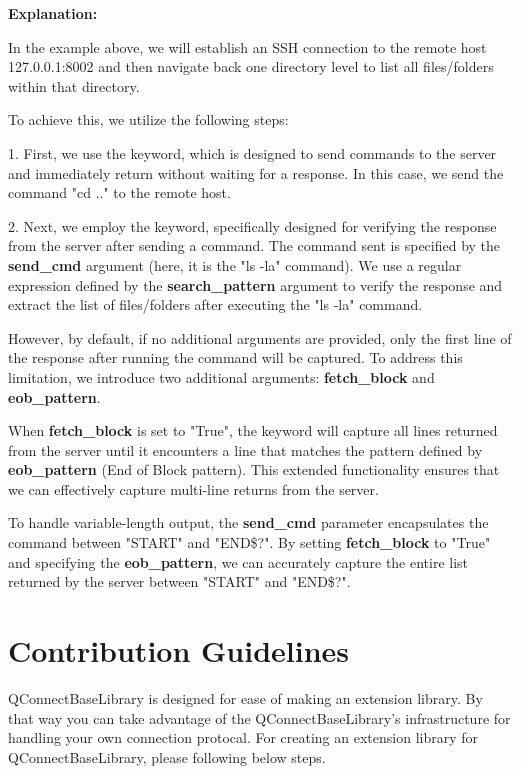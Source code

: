 \textbf{Explanation:}

In the example above, we will establish an SSH connection to the remote host 127.0.0.1:8002 and then navigate back one directory level to list all files/folders within that directory.

To achieve this, we utilize the following steps:

1. First, we use the  keyword, which is designed to send commands to the server and immediately return without waiting for a response. In this case, we send the command "cd .." to the remote host.

2. Next, we employ the  keyword, specifically designed for verifying the response from the server after sending a command. The command sent is specified by the \textbf{send\_cmd} argument (here, it is the "ls -la" command). We use a regular expression defined by the \textbf{search\_pattern} argument to verify the response and extract the list of files/folders after executing the "ls -la" command.

However, by default, if no additional arguments are provided, only the first line of the response after running the command will be captured. To address this limitation, we introduce two additional arguments: \textbf{fetch\_block} and \textbf{eob\_pattern}.

When \textbf{fetch\_block} is set to "True", the  keyword will capture all lines returned from the server until it encounters a line that matches the pattern defined by \textbf{eob\_pattern} (End of Block pattern). This extended functionality ensures that we can effectively capture multi-line returns from the server.

To handle variable-length output, the \textbf{send\_cmd} parameter encapsulates the command between "START" and "END\$?". By setting \textbf{fetch\_block} to "True" and specifying the \textbf{eob\_pattern}, we can accurately capture the entire list returned by the server between "START" and "END\$?".

\hypertarget{description-contribution-guidelines}{%
\section{Contribution Guidelines}\label{description-contribution-guidelines}}

QConnectBaseLibrary is designed for ease of making an extension library.
By that way you can take advantage of the QConnectBaseLibrary's
infrastructure for handling your own connection protocal. For creating
an extension library for QConnectBaseLibrary, please following below
steps.

